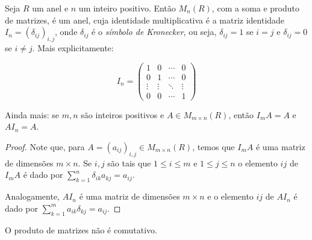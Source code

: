 \begin{proposition}
    Seja $R$ um anel e $n$ um inteiro positivo.
    Então $M_n(R)$, com a soma e produto de matrizes, é um anel, cuja identidade multiplicativa é a matriz identidade $I_n=(\delta_{ij})_{i, j}$, onde $\delta_{ij}$ é o \emph{símbolo de Kronecker}, ou seja, $\delta_{ij}=1$ se $i=j$ e $\delta_{ij}=0$ se $i\neq j$.
    Mais explicitamente:

    \begin{equation*}
        I_n = \begin{pmatrix}
            1 & 0 & \cdots & 0 \\
            0 & 1 & \cdots & 0 \\
            \vdots & \vdots & \ddots & \vdots \\
            0 & 0 & \cdots & 1
        \end{pmatrix}
    \end{equation*}

    Ainda mais: se $m, n$ são inteiros positivos e $A \in M_{m \times n}(R)$, então $I_m A=A$ e $AI_n=A$.
\end{proposition}
\begin{proof}
    Note que, para $A=(a_{ij})_{i, j}\in M_{m \times n}(R)$, temos que $I_m A$ é uma matriz de dimensões $m \times n$. Se $i, j$ são tais que $1\leq i \leq m$ e $1\leq j \leq n$ o elemento $ij$ de $I_m A$ é dado por $\sum_{k=1}^n \delta_{ik}a_{kj}=a_{ij}$.

    Analogamente, $AI_n$ é uma matriz de dimensões $m \times n$ e o elemento $ij$ de $AI_n$ é dado por $\sum_{k=1}^m a_{ik}\delta_{kj}=a_{ij}$.
\end{proof}

O produto de matrizes não é comutativo.

